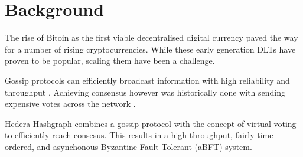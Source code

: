 \section{Background}

The rise of Bitoin as the first viable decentralised digital currency paved the way for a number of rising cryptocurrencies. While these early generation DLTs have proven to be popular, scaling them have been a challenge. 


Gossip protocols can efficiently broadcast information with high reliability and throughput \cite{birman}. Achieving consensus however was historically done with sending expensive votes across the network \cite{berman1989towards}.

Hedera Hashgraph\cite{baird2016} combines a gossip protocol with the concept of virtual voting to efficiently reach consesus. This results in a high throughput, fairly time ordered, and asynchonous Byzantine Fault Tolerant (aBFT) system.
